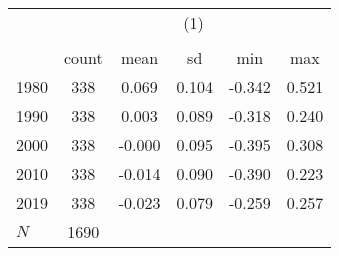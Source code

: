 {
\def\sym#1{\ifmmode^{#1}\else\(^{#1}\)\fi}
\begin{tabular}{l*{1}{ccccc}}
\toprule
            &\multicolumn{5}{c}{(1)}                                         \\
            &\multicolumn{5}{c}{}                                            \\
            &       count&        mean&          sd&         min&         max\\
\midrule
1980        &         338&       0.069&       0.104&      -0.342&       0.521\\
1990        &         338&       0.003&       0.089&      -0.318&       0.240\\
2000        &         338&      -0.000&       0.095&      -0.395&       0.308\\
2010        &         338&      -0.014&       0.090&      -0.390&       0.223\\
2019        &         338&      -0.023&       0.079&      -0.259&       0.257\\
\midrule
\(N\)       &        1690&            &            &            &            \\
\bottomrule
\end{tabular}
}
